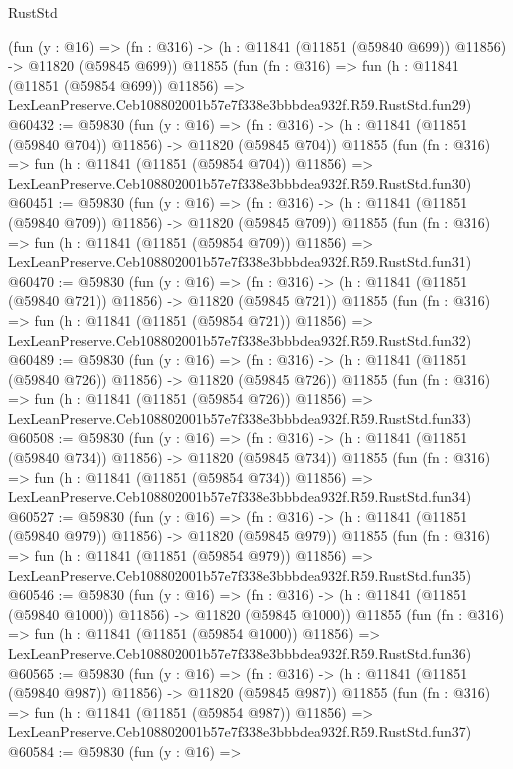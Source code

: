 \begin{lexlean}{RustStd}
\begin{coremodule}
    (fun (y : @16) =>
    (fn : @316) -> (h : @11841 (@11851 (@59840 @699)) @11856) -> @11820 (@59845 @699))
    @11855
    (fun (fn : @316) =>
    fun (h : @11841 (@11851 (@59854 @699)) @11856) =>
    LexLeanPreserve.Ceb108802001b57e7f338e3bbbdea932f.R59.RustStd.fun29)
@60432 := @59830
    (fun (y : @16) =>
    (fn : @316) -> (h : @11841 (@11851 (@59840 @704)) @11856) -> @11820 (@59845 @704))
    @11855
    (fun (fn : @316) =>
    fun (h : @11841 (@11851 (@59854 @704)) @11856) =>
    LexLeanPreserve.Ceb108802001b57e7f338e3bbbdea932f.R59.RustStd.fun30)
@60451 := @59830
    (fun (y : @16) =>
    (fn : @316) -> (h : @11841 (@11851 (@59840 @709)) @11856) -> @11820 (@59845 @709))
    @11855
    (fun (fn : @316) =>
    fun (h : @11841 (@11851 (@59854 @709)) @11856) =>
    LexLeanPreserve.Ceb108802001b57e7f338e3bbbdea932f.R59.RustStd.fun31)
@60470 := @59830
    (fun (y : @16) =>
    (fn : @316) -> (h : @11841 (@11851 (@59840 @721)) @11856) -> @11820 (@59845 @721))
    @11855
    (fun (fn : @316) =>
    fun (h : @11841 (@11851 (@59854 @721)) @11856) =>
    LexLeanPreserve.Ceb108802001b57e7f338e3bbbdea932f.R59.RustStd.fun32)
@60489 := @59830
    (fun (y : @16) =>
    (fn : @316) -> (h : @11841 (@11851 (@59840 @726)) @11856) -> @11820 (@59845 @726))
    @11855
    (fun (fn : @316) =>
    fun (h : @11841 (@11851 (@59854 @726)) @11856) =>
    LexLeanPreserve.Ceb108802001b57e7f338e3bbbdea932f.R59.RustStd.fun33)
@60508 := @59830
    (fun (y : @16) =>
    (fn : @316) -> (h : @11841 (@11851 (@59840 @734)) @11856) -> @11820 (@59845 @734))
    @11855
    (fun (fn : @316) =>
    fun (h : @11841 (@11851 (@59854 @734)) @11856) =>
    LexLeanPreserve.Ceb108802001b57e7f338e3bbbdea932f.R59.RustStd.fun34)
@60527 := @59830
    (fun (y : @16) =>
    (fn : @316) -> (h : @11841 (@11851 (@59840 @979)) @11856) -> @11820 (@59845 @979))
    @11855
    (fun (fn : @316) =>
    fun (h : @11841 (@11851 (@59854 @979)) @11856) =>
    LexLeanPreserve.Ceb108802001b57e7f338e3bbbdea932f.R59.RustStd.fun35)
@60546 := @59830
    (fun (y : @16) =>
    (fn : @316) -> (h : @11841 (@11851 (@59840 @1000)) @11856) -> @11820 (@59845 @1000))
    @11855
    (fun (fn : @316) =>
    fun (h : @11841 (@11851 (@59854 @1000)) @11856) =>
    LexLeanPreserve.Ceb108802001b57e7f338e3bbbdea932f.R59.RustStd.fun36)
@60565 := @59830
    (fun (y : @16) =>
    (fn : @316) -> (h : @11841 (@11851 (@59840 @987)) @11856) -> @11820 (@59845 @987))
    @11855
    (fun (fn : @316) =>
    fun (h : @11841 (@11851 (@59854 @987)) @11856) =>
    LexLeanPreserve.Ceb108802001b57e7f338e3bbbdea932f.R59.RustStd.fun37)
@60584 := @59830
    (fun (y : @16) =>

\end{coremodule}
\end{lexlean}
